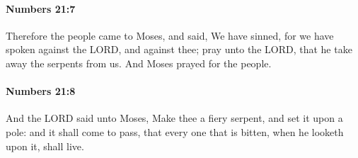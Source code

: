 		\paragraph{Numbers 21:7} %
			\label{NUMBERS-21-7}

			Therefore the people came to Moses, and said, We have sinned, for we have spoken against the LORD, and against thee; pray unto the LORD, that he take away the serpents from us. And Moses prayed for the people.


		\paragraph{Numbers 21:8} %
			\label{NUMBERS-21-8}

			And the LORD said unto Moses, Make thee a fiery serpent, and set it upon a pole: and it shall come to pass, that every one that is bitten, when he looketh upon it, shall live.

